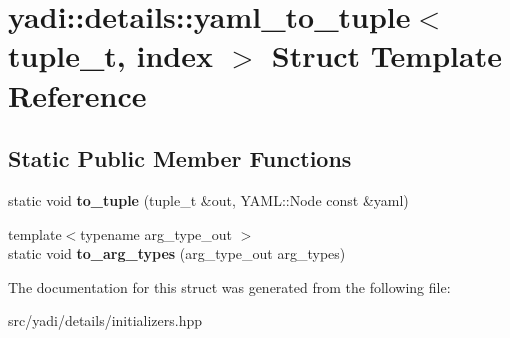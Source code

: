 \hypertarget{structyadi_1_1details_1_1yaml__to__tuple}{}\section{yadi\+:\+:details\+:\+:yaml\+\_\+to\+\_\+tuple$<$ tuple\+\_\+t, index $>$ Struct Template Reference}
\label{structyadi_1_1details_1_1yaml__to__tuple}
\subsection*{Static Public Member Functions}
\begin{DoxyCompactItemize}
\item 
\mbox{\label{structyadi_1_1details_1_1yaml__to__tuple_a0e0419b468a6df3f8f9427e1836d641c}} 
static void {\bfseries to\+\_\+tuple} (tuple\+\_\+t \&out, Y\+A\+M\+L\+::\+Node const \&yaml)
\item 
\mbox{\label{structyadi_1_1details_1_1yaml__to__tuple_ae25dd83334168cf48bf6bcf7d1c942c2}} 
{\footnotesize template$<$typename arg\+\_\+type\+\_\+out $>$ }\\static void {\bfseries to\+\_\+arg\+\_\+types} (arg\+\_\+type\+\_\+out arg\+\_\+types)
\end{DoxyCompactItemize}


The documentation for this struct was generated from the following file\+:\begin{DoxyCompactItemize}
\item 
src/yadi/details/initializers.\+hpp\end{DoxyCompactItemize}
